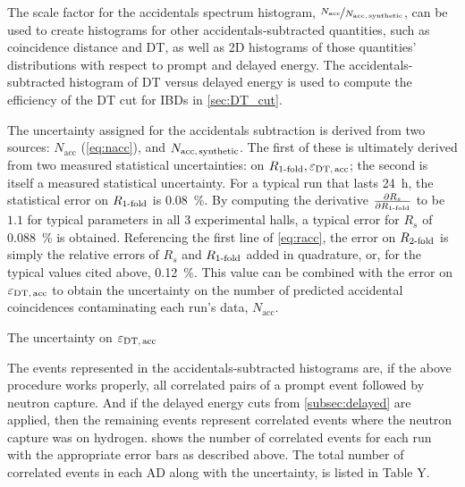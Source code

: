 
The scale factor for the accidentals spectrum histogram,
$\nicefrac{N_{\text{acc}}}{N_{\text{acc,\,synthetic}}}$,
can be used to create histograms for other accidentals-subtracted quantities,
such as coincidence distance and DT, as well as 2D histograms of
those quantities' distributions with respect to prompt and delayed energy.
The accidentals-subtracted histogram of DT versus delayed energy
is used to compute the efficiency of the DT cut for IBDs in \cref{sec:DT_cut}.

The uncertainty assigned for the accidentals subtraction
is derived from two sources: $N_{\text{acc}}$ (\cref{eq:nacc}),
and $N_{\text{acc,\,synthetic}}$.
The first of these is ultimately derived from
two measured statistical uncertainties:
on $R_{\text{\ensuremath{1}-fold}}, \varepsilon_{\text{DT,\,acc}}$;
the second is itself a measured statistical uncertainty.
For a typical run that lasts \SI{24}{\hour},
the statistical error on $R_{\text{\ensuremath{1}-fold}}$ is \SI{0.08}{\percent}.
By computing the derivative $\frac{\partial R_s}{\partial R_{\text{\ensuremath{1}-fold}}}$
to be $1.1$ for typical parameters in all 3 experimental halls,
a typical error for $R_s$ of \SI{0.088}{\percent} is obtained.
Referencing the first line of \cref{eq:racc},
the error on $R_{\text{\ensuremath{2}-fold}}$ is simply the relative errors
of $R_s$ and $R_{\text{\ensuremath{1}-fold}}$ added in quadrature,
or, for the typical values cited above, \SI{0.12}{\percent}.
This value can be combined with the error on $\varepsilon_{\text{DT,\,acc}}$
to obtain the uncertainty on the number of predicted accidental coincidences
contaminating each run's data, $N_{\text{acc}}$.

The uncertainty on $\varepsilon_{\text{DT,\,acc}}$ 

The events represented in the accidentals-subtracted histograms
are, if the above procedure works properly, all correlated pairs
of a prompt event followed by neutron capture.
And if the delayed energy cuts from \cref{subsec:delayed} are applied,
then the remaining events represent correlated events
where the neutron capture was on hydrogen.
 shows the number of correlated events for each run
with the appropriate error bars as described above.
The total number of correlated events in each AD
along with the uncertainty, is listed in Table Y.

